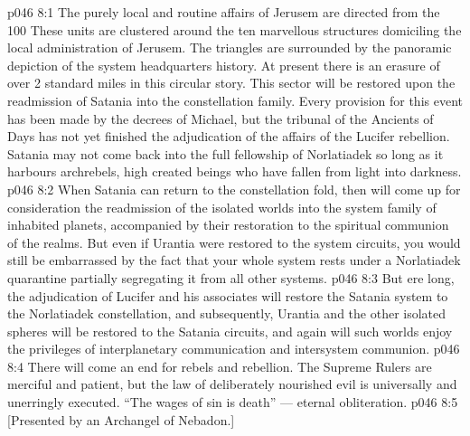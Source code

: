 \vs p046 8:1 The purely local and routine affairs of Jerusem are directed from the 100  These units are clustered around the ten marvellous structures domiciling the local administration of Jerusem. The triangles are surrounded by the panoramic depiction of the system headquarters history. At present there is an erasure of over 2 standard miles in this circular story. This sector will be restored upon the readmission of Satania into the constellation family. Every provision for this event has been made by the decrees of Michael, but the tribunal of the Ancients of Days has not yet finished the adjudication of the affairs of the Lucifer rebellion. Satania may not come back into the full fellowship of Norlatiadek so long as it harbours archrebels, high created beings who have fallen from light into darkness.
\vs p046 8:2 When Satania can return to the constellation fold, then will come up for consideration the readmission of the isolated worlds into the system family of inhabited planets, accompanied by their restoration to the spiritual communion of the realms. But even if Urantia were restored to the system circuits, you would still be embarrassed by the fact that your whole system rests under a Norlatiadek quarantine partially segregating it from all other systems.
\vs p046 8:3 \pc But ere long, the adjudication of Lucifer and his associates will restore the Satania system to the Norlatiadek constellation, and subsequently, Urantia and the other isolated spheres will be restored to the Satania circuits, and again will such worlds enjoy the privileges of interplanetary communication and intersystem communion.
\vs p046 8:4 \pc There will come an end for rebels and rebellion. The Supreme Rulers are merciful and patient, but the law of deliberately nourished evil is universally and unerringly executed. “The wages of sin is death” --- eternal obliteration.
\vsetoff
\vs p046 8:5 [Presented by an Archangel of Nebadon.]
